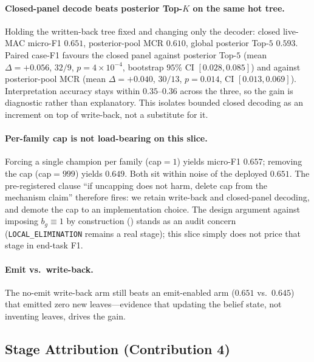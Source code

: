 \paragraph{Closed-panel decode beats posterior Top-$K$ on the same hot tree.}
Holding the written-back tree fixed and changing only the decoder: closed live-MAC micro-F1 $0.651$, posterior-pool MCR $0.610$, global posterior Top-$5$ $0.593$.
Paired case-F1 favours the closed panel against posterior Top-$5$ (mean $\Delta{=}{+}0.056$, $32/9$, $p{=}4{\times}10^{-4}$, bootstrap $95\%$ CI $[0.028,0.085]$) and against posterior-pool MCR (mean $\Delta{=}{+}0.040$, $30/13$, $p{=}0.014$, CI $[0.013,0.069]$).
Interpretation accuracy stays within $0.35$--$0.36$ across the three, so the gain is diagnostic rather than explanatory.
This isolates bounded closed decoding as an increment on top of write-back, not a substitute for it.

\paragraph{Per-family cap is not load-bearing on this slice.}
Forcing a single champion per family (cap${=}1$) yields micro-F1 $0.657$; removing the cap (cap${=}999$) yields $0.649$.
Both sit within noise of the deployed $0.651$.
The pre-registered clause ``if uncapping does not harm, delete cap from the mechanism claim'' therefore fires: we retain write-back and closed-panel decoding, and demote the cap to an implementation choice.
The design argument against imposing $b_g{\equiv}1$ by construction () stands as an audit concern (\texttt{LOCAL\_ELIMINATION} remains a real stage); this slice simply does not price that stage in end-task F1.

\paragraph{Emit vs.\ write-back.}
The no-emit write-back arm still beats an emit-enabled arm ($0.651$ vs.\ $0.645$) that emitted zero new leaves---evidence that updating the belief state, not inventing leaves, drives the gain.

\subsection{Stage Attribution (Contribution 4)}
\label{sec:res-tax}

